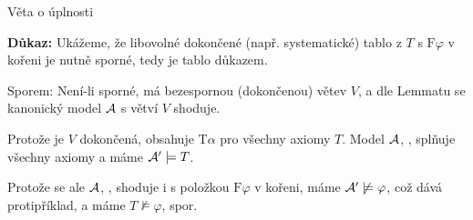 \documentclass{beamer}
\begin{document}
\begin{frame}{Věta o úplnosti}

    
    \smallskip

    \textbf{Důkaz:}
    Ukážeme, že libovolné dokončené (např. \alert{systematické}) tablo z $T$ s $\mathrm{F}\varphi$ v kořeni je nutně sporné, tedy je tablo důkazem. 
    
    Sporem: \alert{Není-li sporné}, má bezespornou (dokončenou) větev $V$, a dle Lemmatu se kanonický model $\mathcal{A}$ s větví $V$ shoduje. 
    

    Protože je $V$ dokončená, obsahuje $\mathrm{T}\alpha$ pro všechny axiomy $T$. Model $\mathcal{A}$, , splňuje všechny axiomy a máme \alert{$\mathcal{A}'\models T$}. 
    
    Protože se ale $\mathcal{A}$, , shoduje i s položkou $\mathrm{F}\varphi$ v kořeni, máme \alert{$\mathcal{A}'\not\models\varphi$}, což dává protipříklad, a máme \alert{$T\not\models\varphi$}, spor.\hfill\qedsymbol

\end{frame}
\end{document}
